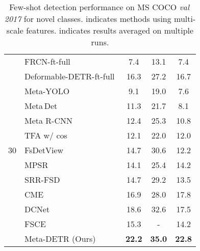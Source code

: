 \documentclass[letterpaper]{article} \usepackage{aaai22}  \usepackage{times}  \usepackage{helvet}  \usepackage{courier}  \usepackage[hyphens]{url}  \usepackage{graphicx} \urlstyle{rm} \def\UrlFont{\rm}  \usepackage{natbib}  \usepackage{caption} \DeclareCaptionStyle{ruled}{labelfont=normalfont,labelsep=colon,strut=off} \frenchspacing  \setlength{\pdfpagewidth}{8.5in}  \setlength{\pdfpageheight}{11in}  \usepackage{algorithm}
\begin{document}
\begin{table}[t!]
\begin{center}
{\begin{tabular}[t]{ c | l | ccc }
\multirow{13}{*}{30} & FRCN-ft-full\;\cite{FasterRCNN}\,\, & 7.4 & 13.1 & 7.4 \\

& Deformable-DETR-ft-full\,\cite{DeformableDETR}\, & 16.3 & 27.2 & 16.7 \\

& Meta-YOLO\;\cite{FewshotReweighting} & 9.1 & 19.0 & 7.6\\

& Meta\,Det\;\cite{metadet} & 11.3 & 21.7 & 8.1\\

& Meta R-CNN\;\cite{metarcnn} & 12.4 & 25.3 & 10.8 \\

& TFA w/ cos\;\cite{fsdet}\,\, & 12.1 & 22.0 & 12.0 \\

& FsDetView\;\cite{FSDetView}\, & 14.7 & 30.6 & 12.2 \\

& MPSR\;\cite{MPSR}\,\ & 14.1 & 25.4 & 14.2 \\

& SRR-FSD\;\cite{SRR-FSD}\, & 14.7 & 29.2 & 13.5 \\

& CME\;\cite{CME}\, & 16.9 & 28.0 & 17.8 \\

& DCNet\;\cite{DenseRelationDistillation}\,\, & 18.6 & 32.6 & 17.5 \\

& FSCE\;\cite{fsce}\,\, & 15.3 & - & 14.2 \\

& \cellcolor{black!6}Meta-DETR (Ours)\, & \cellcolor{black!6}\textbf{22.2} & \cellcolor{black!6}\textbf{35.0} & \cellcolor{black!6}\textbf{22.8} \\

\bottomrule[1.0pt]

\end{tabular}
}
\end{center}
\vspace*{-3.0mm}
\caption{Few-shot detection performance on MS COCO \textit{val\,2017} for novel classes.   indicates methods using multi-scale features.  indicates results averaged on multiple runs.}
\label{tab:Performance_COCO_novel}
\vspace*{-2.0mm}
\end{table}
\end{document}
